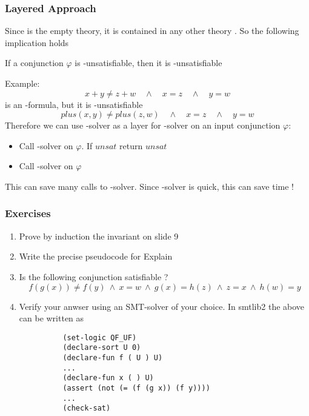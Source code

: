 \begin{frame}
  \frametitle{Layered Approach}

  Since \Uf is the empty theory, it is contained in any other theory \T. So the following
  implication holds
  \begin{center}
  If a conjunction $\varphi$ is \Uf-unsatisfiable, then it is \T-unsatisfiable
  \end{center}
  \vfill
  Example:
  $$
    x + y \not= z + w\quad\wedge\quad x = z\quad\wedge\quad y = w
  $$
  is an \Lra-formula, but it is \Uf-unsatisfiable\pause
  $$
    plus(x,y) \not= plus(z,w)\quad\wedge\quad x = z\quad\wedge\quad y = w
  $$
  \vfill\pause
  Therefore we can use \Uf-solver as a layer for \Lra-solver on an input conjunction $\varphi$:
  \begin{itemize}
    \item Call \Uf-solver on $\varphi$. If $unsat$ return $unsat$
    \item Call \Lra-solver on $\varphi$
  \end{itemize}
  This can save many calls to \Lra-solver. Since \Uf-solver is quick, this can save time !

\end{frame}

\begin{frame}[fragile]
  \frametitle{Exercises}

  \begin{enumerate}
    \item Prove by induction the invariant on slide 9
    \vfill
    \item Write the precise pseudocode for Explain
    \vfill
    \item Is the following conjunction satisfiable ?
          $$
	    f(g(x))\!\not=\!f(y)\ \wedge\ x\!=\!w\ \wedge\ g(x)\!=\!h(z)\ \wedge\ z\!=\!x\ \wedge\ h(w)\!=\!y  
	  $$
    \vfill
    \item Verify your anwser using an SMT-solver of your choice. In smtlib2 the above
          can be written as
	  \begin{verbatim}
          (set-logic QF_UF)
          (declare-sort U 0)
          (declare-fun f ( U ) U)
          ...
          (declare-fun x ( ) U)
          (assert (not (= (f (g x)) (f y))))
          ...
          (check-sat)
	  \end{verbatim}
  \end{enumerate}

\end{frame}
